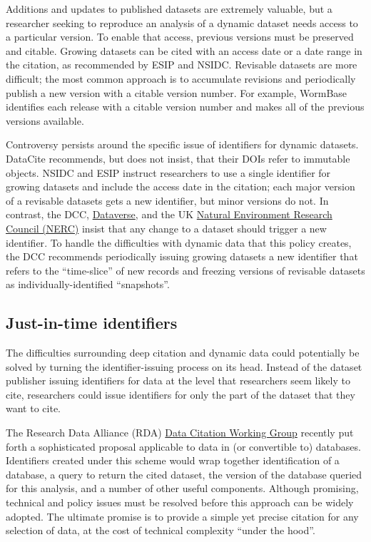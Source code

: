 \documentclass[10pt,a4paper,twocolumn]{article}
\begin{document}
{Additions and updates to published datasets are extremely valuable, but a researcher seeking to reproduce an analysis of a dynamic dataset needs access to a particular version.
To enable that access, previous versions must be preserved and citable.
Growing datasets can be cited with an access date or a date range in the citation, as recommended by ESIP and NSIDC.
Revisable datasets are more difficult; the most common approach is to accumulate revisions and periodically publish a new version with a citable version number.
For example, WormBase identifies each release with a citable version number and makes all of the previous versions available.

Controversy persists around the specific issue of identifiers for dynamic datasets. 
DataCite recommends, but does not insist, that their DOIs refer to immutable objects.
NSIDC and ESIP instruct researchers to use a single identifier for growing datasets and include the access date in the citation; each major version of a revisable datasets gets a new identifier, but minor versions do not.
In contrast, the DCC, \href{http://thedata.org/}{Dataverse}, and the UK \href{http://www.nerc.ac.uk/}{Natural Environment Research Council (NERC)} insist that any change to a dataset should trigger a new identifier\cite{ball_how_2012,altman_proposed_2007,sarah_callaghan_making_2012}.
To handle the difficulties with dynamic data that this policy creates, the DCC recommends periodically issuing growing datasets a new identifier that refers to the ``time-slice'' of new records and freezing versions of revisable datasets as individually-identified ``snapshots''.

\subsection*{Just-in-time identifiers}\label{just-in-time-identifiers}

The difficulties surrounding deep citation and dynamic data could potentially be solved by turning the identifier-issuing process on its head.
Instead of the dataset publisher issuing identifiers for data at the level that researchers seem likely to cite, researchers could issue identifiers for only the part of the dataset that they want to cite.

The Research Data Alliance (RDA) \href{http://rd-alliance.org/working-groups/data-citation-wg.html}{Data Citation Working Group} recently put forth a sophisticated proposal applicable to data in (or convertible to) databases.
Identifiers created under this scheme would wrap together identification of a database, a query to return the cited dataset, the version of the database queried for this analysis, and a number of other useful components.
Although promising, technical and policy issues must be resolved before this approach can be widely adopted.
The ultimate promise is to provide a simple yet precise citation for any selection of data, at the cost of technical complexity ``under the hood''.




}
\end{document}
